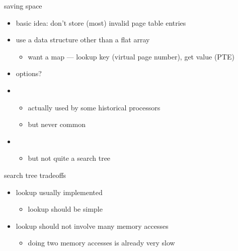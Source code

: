 \begin{frame}{saving space}
\begin{itemize}
    \item basic idea: don't store (most) invalid page table entries
    \item use a data structure other than a flat array
        \begin{itemize}
        \item want a map --- lookup key (virtual page number), get value (PTE)
        \end{itemize}
    \item options?
    \vspace{.5cm}
    \item<2-> 
        \begin{itemize}
        \item<2-> actually used by some historical processors
        \item<2-> but never common
        \end{itemize}
    \item<3-> 
        \begin{itemize}
        \item<3-> but not quite a search tree
        \end{itemize}
\end{itemize}
\end{frame}

\begin{frame}{search tree tradeoffs}
    \begin{itemize}
    \item lookup usually implemented 
        \begin{itemize}
        \item lookup should be simple
        \end{itemize}
    \item lookup should not involve many memory accesses
        \begin{itemize}
        \item doing two memory accesses is already very slow
        \end{itemize}
    \end{itemize}
\end{frame}

